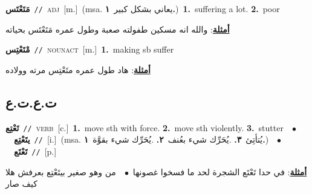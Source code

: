 \documentclass[10pt,a4paper,twoside]{article} %
\begin{document}
\begin{multicols}{2}
{{{{{{{{{{{{\setlength\topsep{0pt}\textbf{\foreignlanguage{arabic}{مَتَعْتَس}}\ {\color{gray}\texttt{//}\color{black}}\ \textsc{adj}\ [m.]\ \color{gray}(msa. \foreignlanguage{arabic}{يعاني بشكل كبير}~\foreignlanguage{arabic}{\textbf{١.}})\color{black}\ \textbf{1.}~suffering a lot.  \textbf{2.}~poor\  \begin{flushright}\color{gray}\foreignlanguage{arabic}{\textbf{\underline{\foreignlanguage{arabic}{أمثلة}}}: والله انه مسكين طفولته صعبة وطول عمره مَتَعْتَس بحياته}\end{flushright}\color{black}} \vspace{2mm}

{\setlength\topsep{0pt}\textbf{\foreignlanguage{arabic}{مْتَعْتِس}}\ {\color{gray}\texttt{//}\color{black}}\ \textsc{noun\textunderscore act}\ [m.]\ \textbf{1.}~making sb suffer\  \begin{flushright}\color{gray}\foreignlanguage{arabic}{\textbf{\underline{\foreignlanguage{arabic}{أمثلة}}}: هاد طول عمره متَعْتِس مرته وولاده}\end{flushright}\color{black}} \vspace{2mm}

\vspace{-3mm}
\subsection*{\color{blue}\foreignlanguage{arabic}{ت.ع.ت.ع}\color{blue}{}} 

{\setlength\topsep{0pt}\textbf{\foreignlanguage{arabic}{تَعْتِع}}\ {\color{gray}\texttt{//}\color{black}}\ \textsc{verb}\ [c.]\ \textbf{1.}~move sth with force.  \textbf{2.}~move sth violently.  \textbf{3.}~stutter\ \ $\bullet$\ \ \setlength\topsep{0pt}\textbf{\foreignlanguage{arabic}{يتَعْتِع}}\ {\color{gray}\texttt{//}\color{black}}\ [i.]\ \color{gray}(msa. \foreignlanguage{arabic}{يُتأتِئ}~\foreignlanguage{arabic}{\textbf{٣.}}  .\foreignlanguage{arabic}{يُحَرِّك شيء بعُنف}~\foreignlanguage{arabic}{\textbf{٢.}}  .\foreignlanguage{arabic}{يُحَرِّك شيء بقوَّة}~\foreignlanguage{arabic}{\textbf{١.}})\color{black}\ \ $\bullet$\ \ \setlength\topsep{0pt}\textbf{\foreignlanguage{arabic}{تَعْتَع}}\ {\color{gray}\texttt{//}\color{black}}\ [p.]\  \begin{flushright}\color{gray}\foreignlanguage{arabic}{\textbf{\underline{\foreignlanguage{arabic}{أمثلة}}}: في حدا تَعْتَع الشجرة لحد ما فسخوا غصونها\ $\bullet$\ \  من وهو صغير بيتَعْتِع بعرفش هلا كيف صار}\end{flushright}\color{black}} \vspace{2mm}

}}}}}}}}}}}
\end{multicols}
\end{document}

